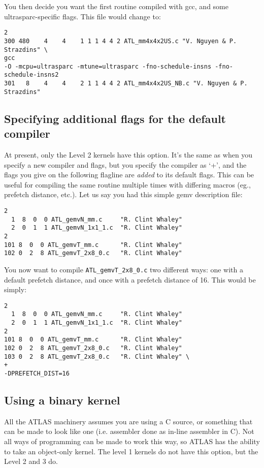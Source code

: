 \documentclass[11pt]{article}
\begin{document}
You then decide you want the first routine compiled with gcc, and some
ultrasparc-specific flags.  This file would change to:
\begin{verbatim}
2
300 480    4    4    1 1 1 4 4 2 ATL_mm4x4x2US.c "V. Nguyen & P. Strazdins" \
gcc
-O -mcpu=ultrasparc -mtune=ultrasparc -fno-schedule-insns -fno-schedule-insns2
301   8    4    4    2 1 1 4 4 2 ATL_mm4x4x2US_NB.c "V. Nguyen & P. Strazdins"
\end{verbatim}

\subsection{Specifying additional flags for the default compiler}
At present, only the Level 2 kernels have this option.  It's the same as
when you specify a new compiler and flags, but you specify the compiler
as `+', and the flags you give on the following flagline
are {\em added} to its default flags.  This can be useful for compiling
the same routine multiple times with differing macros (eg., prefetch
distance, etc.).
Let us say you had this simple gemv description file:
\begin{verbatim}
2
  1  8  0  0 ATL_gemvN_mm.c     "R. Clint Whaley"
  2  0  1  1 ATL_gemvN_1x1_1.c  "R. Clint Whaley"
2
101 8  0  0 ATL_gemvT_mm.c      "R. Clint Whaley"
102 0  2  8 ATL_gemvT_2x8_0.c   "R. Clint Whaley"
\end{verbatim}

You now want to compile {\tt ATL\_gemvT\_2x8\_0.c} two different ways:
one with a default prefetch distance, and once with a prefetch distance of
16.  This would be simply:
\begin{verbatim}
2
  1  8  0  0 ATL_gemvN_mm.c     "R. Clint Whaley"
  2  0  1  1 ATL_gemvN_1x1_1.c  "R. Clint Whaley"
2
101 8  0  0 ATL_gemvT_mm.c      "R. Clint Whaley"
102 0  2  8 ATL_gemvT_2x8_0.c   "R. Clint Whaley"
103 0  2  8 ATL_gemvT_2x8_0.c   "R. Clint Whaley" \
+
-DPREFETCH_DIST=16
\end{verbatim}

\subsection{Using a binary kernel}
All the ATLAS machinery assumes you are using a C source, or something
that can be made to look like one (i.e. assembler done as in-line assembler
in C).  Not all ways of programming can be made to work this way, so ATLAS
has the ability to take an object-only kernel.  The level 1 kernels do not
have this option, but the Level 2 and 3 do.
\end{document}
